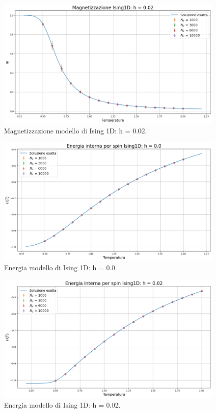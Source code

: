 \begin{figure}[H]
    \centering
    \includegraphics[width=\textwidth]{Immagini/simIsing1D/magn_h0.02.png}
    \caption{Magnetizzazione modello di Ising 1D: h = 0.02.}
    \label{fig: magn_Ising1D_h0.02}
\end{figure}

\begin{figure}[H]
    \centering
    \includegraphics[width=\textwidth]{Immagini/simIsing1D/ene_h0.0.png}
    \caption{Energia modello di Ising 1D: h = 0.0.}
    \label{fig: ene_Ising1D_h0.0}
\end{figure}

\begin{figure}[H]
    \centering
    \includegraphics[width=\textwidth]{Immagini/simIsing1D/ene_h0.02.png}
    \caption{Energia modello di Ising 1D: h = 0.02.}
    \label{fig: ene_Ising1D_h0.02}
\end{figure}

